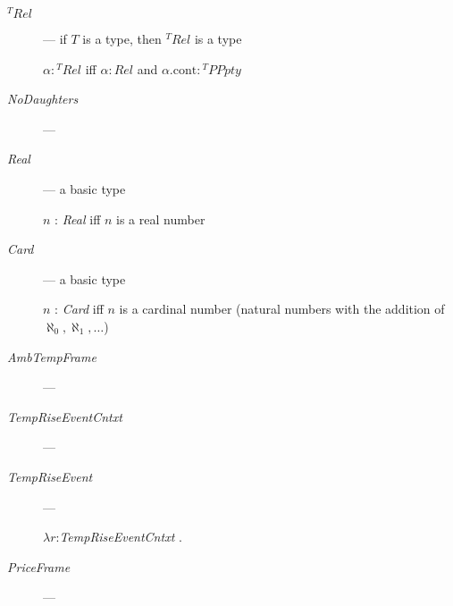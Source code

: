 \begin{description}
  
\item[\textnormal{$^T\textit{Rel}$}] --- if $T$ is a type, then
  $^T\textit{Rel}$ is a type

  $\alpha:{^T\textit{Rel}}$ iff
  $\alpha:\textit{Rel}$ and $\alpha.\text{cont}:{^T\textit{PPpty}}$
  
\item[\textnormal{\textit{NoDaughters}}] ---

  
\item[\textnormal{\textit{Real}}] --- a basic type

  $n$ : \textit{Real} iff $n$ is a real number

  
\item[\textnormal{\textit{Card}}] --- a basic type

  $n$ : \textit{Card} iff $n$ is a cardinal number (natural numbers
  with the addition of $\aleph_0, \aleph_1,\ldots$)
 

  

\item[\textnormal{\textit{AmbTempFrame}}] --- 

      
    \item[\textnormal{\textit{TempRiseEventCntxt}}] ---
      
    \item[\textnormal{\textit{TempRiseEvent}}] ---
      
      $\lambda r$:\textit{TempRiseEventCntxt} .\\  
\hspace*{2em}
      
    \item[\textnormal{\textit{PriceFrame}}] --- 
      

\end{description}
